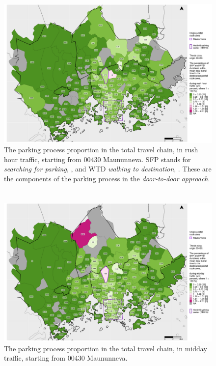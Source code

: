 \begin{figure}
    \section{}
    \centering
    \includegraphics[trim={0.9cm 0.3cm 0.25cm 0.3cm},clip,width=\textwidth]{images/compare_traveltimes_mapfill-msc_r_pct_fromzip-00430_11-10-2020.png}
    \caption[Parking process proportion from Maununneva, rush hour traffic]{The parking process proportion in the total travel chain, in rush hour traffic, starting from 00430 Maununneva. SFP stands for \textit{searching for parking}, , and WTD \textit{walking to destination}, . These are the components of the parking process in the \textit{door-to-door approach}.}%
    \label{fig:compare_msc_r_pct_00430}%
\end{figure}

\begin{figure}
    \section{}
    \centering
    \includegraphics[trim={0.9cm 0.3cm 0.25cm 0.3cm},clip,width=\textwidth]{images/compare_traveltimes_mapfill-msc_m_pct_fromzip-00430_11-10-2020.png}
    \caption[Parking process proportion from Maununneva, midday traffic]{The parking process proportion in the total travel chain, in midday traffic, starting from 00430 Maununneva.}%
    \label{fig:compare_msc_m_pct_00430}%
\end{figure}

